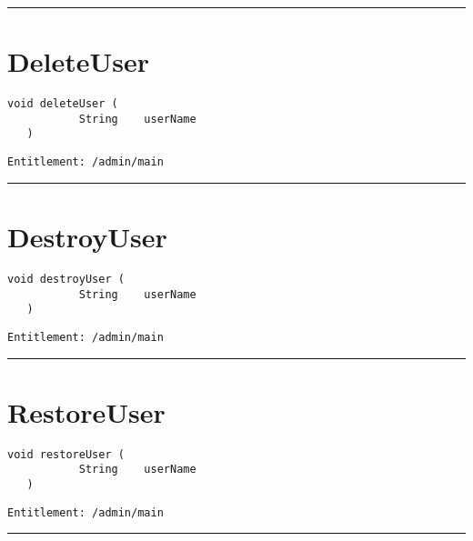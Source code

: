 \rule{12cm}{2pt}
\section{DeleteUser}
\label{Api:DeleteUser}
\begin{lstlisting}[style=nonumbers]
   void deleteUser (
           String    userName
   )
\end{lstlisting}
\begin{Verbatim}[formatcom=\color{Maroon}]
  Entitlement: /admin/main
\end{Verbatim}



\rule{12cm}{2pt}
\section{DestroyUser}
\label{Api:DestroyUser}
\begin{lstlisting}[style=nonumbers]
   void destroyUser (
           String    userName
   )
\end{lstlisting}
\begin{Verbatim}[formatcom=\color{Maroon}]
  Entitlement: /admin/main
\end{Verbatim}



\rule{12cm}{2pt}
\section{RestoreUser}
\label{Api:RestoreUser}
\begin{lstlisting}[style=nonumbers]
   void restoreUser (
           String    userName
   )
\end{lstlisting}
\begin{Verbatim}[formatcom=\color{Maroon}]
  Entitlement: /admin/main
\end{Verbatim}



\rule{12cm}{2pt}
